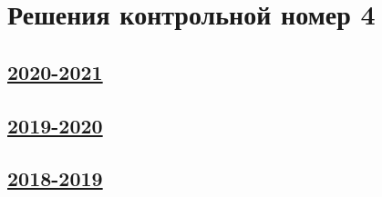 \thispagestyle{empty}
\section{Решения контрольной номер 4}

\subsection[2020-2021]{\hyperref[sec:kr_04_2020_2021]{2020-2021}}
\label{sec:sol_kr_04_2020_2021}

\subsection[2019-2020]{\hyperref[sec:kr_04_2019_2020]{2019-2020}}
\label{sec:sol_kr_04_2019_2020}


\subsection[2018-2019]{\hyperref[sec:kr_04_2018_2019]{2018-2019}}
\label{sec:sol_kr_04_2018_2019}


